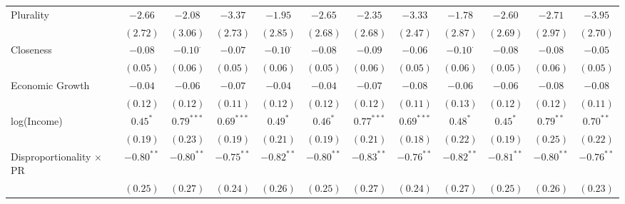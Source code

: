\begin{sidewaystable}
\begin{center}
{\begin{tabular}{l c c c c c c c c c c c }
Plurality                                          & $-2.66$      & $-2.08$         & $-3.37$         & $-1.95$         & $-2.65$      & $-2.35$      & $-3.33$      & $-1.78$         & $-2.60$      & $-2.71$         & $-3.95$         \\
                                                   & $(2.72)$     & $(3.06)$        & $(2.73)$        & $(2.85)$        & $(2.68)$     & $(2.68)$     & $(2.47)$     & $(2.87)$        & $(2.69)$     & $(2.97)$        & $(2.70)$        \\
Closeness                                          & $-0.08$      & $-0.10^{\cdot}$ & $-0.07$         & $-0.10^{\cdot}$ & $-0.08$      & $-0.09$      & $-0.06$      & $-0.10^{\cdot}$ & $-0.08$      & $-0.08$         & $-0.05$         \\
                                                   & $(0.05)$     & $(0.06)$        & $(0.05)$        & $(0.06)$        & $(0.05)$     & $(0.06)$     & $(0.05)$     & $(0.06)$        & $(0.05)$     & $(0.06)$        & $(0.05)$        \\
Economic Growth                                    & $-0.04$      & $-0.06$         & $-0.07$         & $-0.04$         & $-0.04$      & $-0.07$      & $-0.08$      & $-0.06$         & $-0.06$      & $-0.08$         & $-0.08$         \\
                                                   & $(0.12)$     & $(0.12)$        & $(0.11)$        & $(0.12)$        & $(0.12)$     & $(0.12)$     & $(0.11)$     & $(0.13)$        & $(0.12)$     & $(0.12)$        & $(0.11)$        \\
log(Income)                                        & $0.45^{*}$   & $0.79^{***}$    & $0.69^{***}$    & $0.49^{*}$      & $0.46^{*}$   & $0.77^{***}$ & $0.69^{***}$ & $0.48^{*}$      & $0.45^{*}$   & $0.79^{**}$     & $0.70^{**}$     \\
                                                   & $(0.19)$     & $(0.23)$        & $(0.19)$        & $(0.21)$        & $(0.19)$     & $(0.21)$     & $(0.18)$     & $(0.22)$        & $(0.19)$     & $(0.25)$        & $(0.22)$        \\
Disproportionality $\times$ PR                     & $-0.80^{**}$ & $-0.80^{**}$    & $-0.75^{**}$    & $-0.82^{**}$    & $-0.80^{**}$ & $-0.83^{**}$ & $-0.76^{**}$ & $-0.82^{**}$    & $-0.81^{**}$ & $-0.80^{**}$    & $-0.76^{**}$    \\
                                                   & $(0.25)$     & $(0.27)$        & $(0.24)$        & $(0.26)$        & $(0.25)$     & $(0.27)$     & $(0.24)$     & $(0.27)$        & $(0.25)$     & $(0.26)$        & $(0.23)$        \\

\end{tabular}}
\end{center}
\end{sidewaystable}
